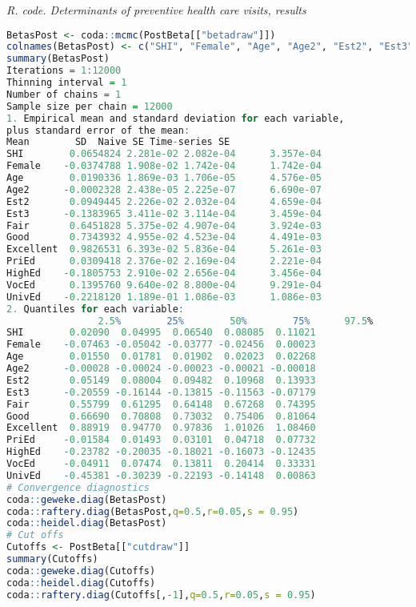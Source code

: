 \begin{tcolorbox}[enhanced,width=4.67in,center upper,
	fontupper=\large\bfseries,drop shadow southwest,sharp corners]
	\textit{R. code. Determinants of preventive health care visits, results}
	\begin{VF}
		\begin{lstlisting}[language=R]
BetasPost <- coda::mcmc(PostBeta[["betadraw"]])
colnames(BetasPost) <- c("SHI", "Female", "Age", "Age2", "Est2", "Est3", "Fair", "Good", "Excellent", "PriEd", "HighEd", "VocEd", "UnivEd")
summary(BetasPost)		
Iterations = 1:12000
Thinning interval = 1 
Number of chains = 1 
Sample size per chain = 12000 
1. Empirical mean and standard deviation for each variable,
plus standard error of the mean:
Mean        SD  Naive SE Time-series SE
SHI        0.0654824 2.281e-02 2.082e-04      3.357e-04
Female    -0.0374788 1.908e-02 1.742e-04      1.742e-04
Age        0.0190336 1.869e-03 1.706e-05      4.576e-05
Age2      -0.0002328 2.438e-05 2.225e-07      6.690e-07
Est2       0.0949445 2.226e-02 2.032e-04      4.659e-04
Est3      -0.1383965 3.411e-02 3.114e-04      3.459e-04
Fair       0.6451828 5.375e-02 4.907e-04      3.924e-03
Good       0.7343932 4.955e-02 4.523e-04      4.491e-03
Excellent  0.9826531 6.393e-02 5.836e-04      5.261e-03
PriEd      0.0309418 2.376e-02 2.169e-04      2.221e-04
HighEd    -0.1805753 2.910e-02 2.656e-04      3.456e-04
VocEd      0.1395760 9.640e-02 8.800e-04      9.291e-04
UnivEd    -0.2218120 1.189e-01 1.086e-03      1.086e-03
2. Quantiles for each variable:
				2.5%        25%        50%        75%      97.5%
SHI        0.02090  0.04995  0.06540  0.08085  0.11021
Female    -0.07463 -0.05042 -0.03777 -0.02456  0.00023
Age        0.01550  0.01781  0.01902  0.02023  0.02268
Age2      -0.00028 -0.00024 -0.00023 -0.00021 -0.00018
Est2       0.05149  0.08004  0.09482  0.10968  0.13933
Est3      -0.20559 -0.16144 -0.13815 -0.11563 -0.07179
Fair       0.55799  0.61295  0.64148  0.67268  0.74395
Good       0.66690  0.70808  0.73032  0.75406  0.81064
Excellent  0.88919  0.94770  0.97836  1.01026  1.08460
PriEd     -0.01584  0.01493  0.03101  0.04718  0.07732
HighEd    -0.23782 -0.20035 -0.18021 -0.16073 -0.12435
VocEd     -0.04911  0.07474  0.13811  0.20414  0.33331
UnivEd    -0.45381 -0.30239 -0.22193 -0.14148  0.00863
# Convergence diagnostics
coda::geweke.diag(BetasPost)
coda::raftery.diag(BetasPost,q=0.5,r=0.05,s = 0.95)
coda::heidel.diag(BetasPost)
# Cut offs
Cutoffs <- PostBeta[["cutdraw"]]
summary(Cutoffs)
coda::geweke.diag(Cutoffs)
coda::heidel.diag(Cutoffs)
coda::raftery.diag(Cutoffs[,-1],q=0.5,r=0.05,s = 0.95)
\end{lstlisting}
	\end{VF}
\end{tcolorbox} 

